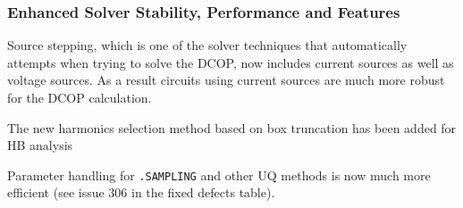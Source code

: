 \documentclass[letterpaper]{scrartcl}
\begin{document}
\subsubsection*{Enhanced Solver Stability, Performance and Features}
\begin{XyceItemize}
\item Source stepping, which is one of the solver techniques that
  \Xyce{} automatically attempts when trying to solve the DCOP, now
  includes current sources as well as voltage sources.  As a result
  circuits using current sources are much more robust for the DCOP
  calculation.
\item The new harmonics selection method based on box truncation has
  been added for HB analysis
\item Parameter handling for \texttt{.SAMPLING} and other UQ methods
  is now much more efficient (see issue 306 in the fixed defects
  table).
\end{XyceItemize}
\end{document}
